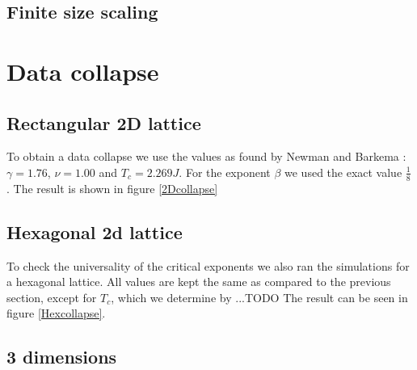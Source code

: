 \documentclass[11pt,twocolumn]{article}
\begin{document}
\subsection{Finite size scaling}
\section{Data collapse}
\subsection{Rectangular 2D lattice}
To obtain a data collapse we use the values as found by Newman and Barkema \cite{Thebook}: $\gamma = 1.76$, $\nu = 1.00$ and $T_c=2.269J$. For the exponent $\beta$ we used the exact value $\frac18$. The result is shown in figure \ref{2Dcollapse}
\subsection{Hexagonal 2d lattice}
To check the universality of the critical exponents we also ran the simulations for a hexagonal lattice. All values are kept the same as compared to the previous section, except for $T_c$, which we determine by {\color{red}...TODO} The result can be seen in figure \ref{Hexcollapse}.
\subsection{3 dimensions}
{}

\end{document}
